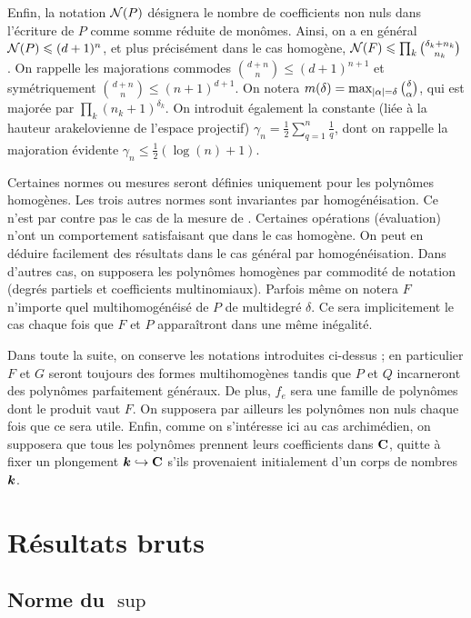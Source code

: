 Enfin, la notation $\mathcal N(P)$ désignera le nombre de coefficients non nuls
dans l'écriture de $P$ comme somme réduite de monômes. Ainsi, on a en général
$\mathcal N(P) \leqslant (d+1)^n$, et plus précisément dans le cas homogène, $\mathcal N(F)
\leqslant \prod\nolimits_k \binom{\delta_k + n_k}{n_k}$. On rappelle les majorations
commodes $\binom{d + n}{n} \le (d + 1)^{n+1}$ et symétriquement $\binom{d +
  n}{n} \le (n + 1)^{d+1}$. On notera $m(\delta) = \max_{\lvert\alpha\rvert = \delta}
{\textstyle \binom\delta\alpha} $, qui est majorée par $\prod\nolimits_k (n_k
+ 1)^{\delta_k}$. On introduit également la constante (liée à la hauteur
arakelovienne de l'espace projectif) $\gamma_n = \frac12 \sum_{q=1}^{n}
\frac1q$, dont on rappelle la majoration évidente $\gamma_n \le \frac12
(\log(n) + 1)$.

Certaines normes ou mesures seront définies uniquement pour les polynômes
homogènes. Les trois autres normes sont invariantes par homogénéisation. Ce
n'est par contre  pas le cas de la mesure de .
Certaines opérations (évaluation) n'ont un comportement satisfaisant que dans
le cas homogène. On peut en déduire facilement des résultats dans le cas
général par homogénéisation. Dans d'autres cas, on supposera les polynômes
homogènes par commodité de notation (degrés partiels et coefficients
multinomiaux). Parfois même on notera $F$ n'importe quel multihomogénéisé de
$P$ de multidegré $\delta$. Ce sera implicitement le cas chaque fois que $F$
et $P$ apparaîtront dans une même inégalité.

Dans toute la suite, on conserve les notations introduites ci-dessus ; en
particulier $F$ et $G$ seront toujours des formes multihomogènes tandis que
$P$ et $Q$ incarneront des polynômes parfaitement généraux. De plus, $f_e$
sera une famille de polynômes dont le produit vaut $F$. On supposera par
ailleurs les polynômes non nuls chaque fois que ce sera utile. Enfin, comme on
s'intéresse ici au cas archimédien, on supposera que tous les polynômes
prennent leurs coefficients dans ${\mathbf{C}}$, quitte à fixer un plongement ${\boldsymbol k}
\hookrightarrow {\mathbf{C}}$ s'ils provenaient initialement d'un corps de nombres
${\boldsymbol k}$.


\section{Résultats bruts}


\subsection{Norme du \texorpdfstring{$\sup$}{sup}}

